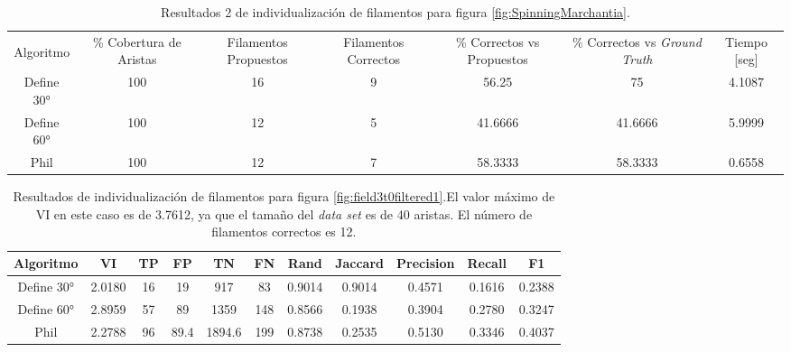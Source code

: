 \begin{table}[h]
    \centering
    \begin{tabular}{|c|c|c|c|c|c|c|}
    \hline
         & \multirow{4}{2cm}{\centering \% Cobertura de Aristas} & \multirow{4}{2cm}{Filamentos Propuestos} & \multirow{4}{2cm}{Filamentos Correctos} & \multirow{4}{2.5cm}{\% Correctos vs Propuestos} & \multirow{4}{2.5cm}{\centering \% Correctos vs {\it Ground Truth}} & \multirow{4}{1.2cm}{\centering Tiempo [seg]} \\
         &  &  &  & & &  \\
        Algoritmo &  &  &  & & &  \\
        &  &  &  & & &  \\ \hline
        Define 30° & 100 & 16 & 9 & 56.25       & 75          & 4.1087 \\
        Define 60° & 100 & 12 & 5 & 41.6666 & 41.6666 & 5.9999 \\ 
        Phil & 100 & 12 & 7 & 58.3333 & 58.3333 & 0.6558 \\
        \hline
    \end{tabular}
    \caption{Resultados 2 de individualizaci\'on de filamentos para figura \ref{fig:SpinningMarchantia}.}
    \label{tab:SpinningMarchantiaResults2}
\end{table}





\begin{table}[h]
    \centering
    \begin{tabular}{|c|c|c|c|c|c|c|c|c|c|c|}
    \hline
        Algoritmo & VI & TP & FP &TN &FN & Rand	& Jaccard &	Precision &	Recall &	F1 \\ \hline
        Define 30° & 2.0180 & 16 & 19 & 917 & 83 & 0.9014 & 0.9014 & 0.4571 & 0.1616 & 0.2388\\
        Define 60° &  2.8959 & 57 & 89 & 1359 & 148 & 0.8566 & 0.1938 & 0.3904 & 0.2780 & 0.3247\\ 
        Phil & 2.2788 & 96 & 89.4 & 1894.6 & 199 & 0.8738 & 0.2535 & 0.5130 & 0.3346 & 0.4037 \\
        \hline
    \end{tabular}
    \caption{Resultados de individualizaci\'on de filamentos para figura \ref{fig:field3t0filtered1}.El valor m\'aximo de VI en este caso es de 3.7612, ya que el tama\~no del {\it data set} es de 40 aristas. El n\'umero de filamentos correctos es 12.}
    \label{tab:field3t0filtered1}
\end{table}


